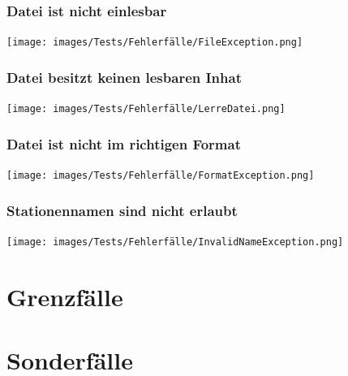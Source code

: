 \subsubsection{Datei ist nicht einlesbar}\label{test:subsec:datei-ist-nicht-einlesbar}
\begin{center}
    \texttt{[image: images/Tests/Fehlerfälle/FileException.png]}
    \label{test:subsecpar:einlese-fehler}
\end{center}

\subsubsection{Datei besitzt keinen lesbaren Inhat}\label{test:subsec:kein-inhalt}
\begin{center}
    \texttt{[image: images/Tests/Fehlerfälle/LerreDatei.png]}
    \label{test:subsecpar:leere-datei}
\end{center}

\subsubsection{Datei ist nicht im richtigen Format}\label{test:subsec:format}
\begin{center}
    \texttt{[image: images/Tests/Fehlerfälle/FormatException.png]}
    \label{test:subsecpar:format-fehler}
\end{center}

\subsubsection{Stationennamen sind nicht erlaubt}\label{test:subsec:namen-sind-nicht-erlaubt}
\begin{center}
    \texttt{[image: images/Tests/Fehlerfälle/InvalidNameException.png]}
    \label{test:subsecpar:namen-sind-nicht-erlaubt}
\end{center}

\section{Grenzfälle}\label{test:sec:grenzfaelle}
\section{Sonderfälle}\label{test:sec:sonderfaelle}
